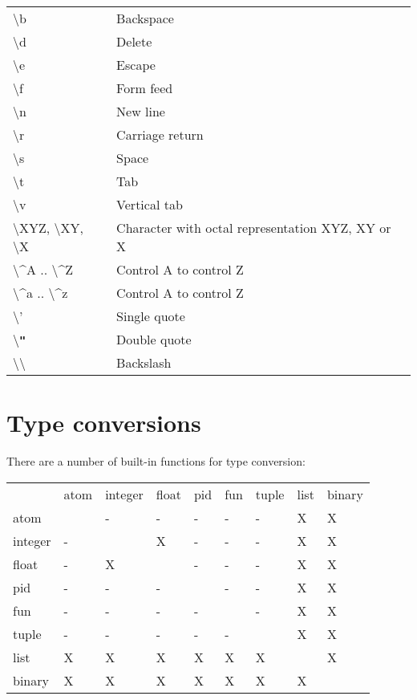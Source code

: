 \begin{center}
\begin{tabular}{|>{\raggedright}p{91pt}|>{\raggedright}p{229pt}|}
\hline
\multicolumn{2}{|p{321pt}|}{Escape sequences}\tabularnewline
\hline
\textbackslash{}b & Backspace\tabularnewline
\hline
\textbackslash{}d & Delete\tabularnewline
\hline
\textbackslash{}e & Escape\tabularnewline
\hline
\textbackslash{}f & Form feed\tabularnewline
\hline
\textbackslash{}n & New line\tabularnewline
\hline
\textbackslash{}r & Carriage return\tabularnewline
\hline
\textbackslash{}s & Space\tabularnewline
\hline
\textbackslash{}t & Tab\tabularnewline
\hline
\textbackslash{}v & Vertical tab\tabularnewline
\hline
\textbackslash{}XYZ, \textbackslash{}XY, \textbackslash{}X & Character with octal
representation XYZ, XY or X\tabularnewline
\hline
\textbackslash{}\textasciicircum{}A .. \textbackslash{}\textasciicircum{}Z & Control
A to control Z\tabularnewline
\hline
\textbackslash{}\textasciicircum{}a .. \textbackslash{}\textasciicircum{}z & Control
A to control Z\tabularnewline
\hline
\textbackslash{}' & Single quote\tabularnewline
\hline
\textbackslash{}\textbf{\texttt{"}} & Double quote\tabularnewline
\hline
\textbackslash{}\textbackslash{} & Backslash\tabularnewline
\hline
\end{tabular}
\end{center}

\section{Type conversions}
There are a number of built-in functions for type conversion:

\begin{center}
\begin{tabular}{|>{\raggedright}p{63pt}|>{\raggedright}p{21pt}|>{\raggedright}p{25pt}|>{\raggedright}p{21pt}|>{\raggedright}p{21pt}|>{\raggedright}p{21pt}|>{\raggedright}p{21pt}|>{\raggedright}p{21pt}|>{\raggedright}p{24pt}|}
\hline
\multicolumn{9}{|p{243pt}|}{Type conversions}\tabularnewline
\hline
 & atom & integer & float & pid & fun & tuple & list & binary\tabularnewline
\hline
atom &  & - & - & - & - & - & X & X\tabularnewline
\hline
integer & - &  & X & - & - & - & X & X\tabularnewline
\hline
float & - & X &  & - & - & - & X & X\tabularnewline
\hline
pid & - & - & - &  & - & - & X & X\tabularnewline
\hline
fun & - & - & - & - &  & - & X & X\tabularnewline
\hline
tuple & - & - & - & - & - &  & X & X\tabularnewline
\hline
list & X & X & X & X & X & X &  & X\tabularnewline
\hline
binary & X & X & X & X & X & X & X & \tabularnewline
\hline
\end{tabular}
\end{center}


